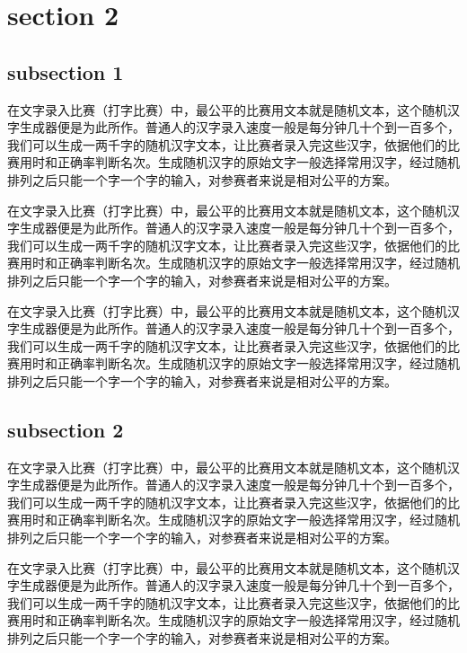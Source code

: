 \documentclass[12pt,hyperref,UTF8]{ctexbook}
\begin{document}
\section{section 2}

\subsection{subsection 1}

在文字录入比赛（打字比赛）中，最公平的比赛用文本就是随机文本，这个随机汉字生成器便是为此所作。普通人的汉字录入速度一般是每分钟几十个到一百多个，我们可以生成一两千字的随机汉字文本，让比赛者录入完这些汉字，依据他们的比赛用时和正确率判断名次。生成随机汉字的原始文字一般选择常用汉字，经过随机排列之后只能一个字一个字的输入，对参赛者来说是相对公平的方案。

在文字录入比赛（打字比赛）中，最公平的比赛用文本就是随机文本，这个随机汉字生成器便是为此所作。普通人的汉字录入速度一般是每分钟几十个到一百多个，我们可以生成一两千字的随机汉字文本，让比赛者录入完这些汉字，依据他们的比赛用时和正确率判断名次。生成随机汉字的原始文字一般选择常用汉字，经过随机排列之后只能一个字一个字的输入，对参赛者来说是相对公平的方案。

在文字录入比赛（打字比赛）中，最公平的比赛用文本就是随机文本，这个随机汉字生成器便是为此所作。普通人的汉字录入速度一般是每分钟几十个到一百多个，我们可以生成一两千字的随机汉字文本，让比赛者录入完这些汉字，依据他们的比赛用时和正确率判断名次。生成随机汉字的原始文字一般选择常用汉字，经过随机排列之后只能一个字一个字的输入，对参赛者来说是相对公平的方案。

\subsection{subsection 2}

在文字录入比赛（打字比赛）中，最公平的比赛用文本就是随机文本，这个随机汉字生成器便是为此所作。普通人的汉字录入速度一般是每分钟几十个到一百多个，我们可以生成一两千字的随机汉字文本，让比赛者录入完这些汉字，依据他们的比赛用时和正确率判断名次。生成随机汉字的原始文字一般选择常用汉字，经过随机排列之后只能一个字一个字的输入，对参赛者来说是相对公平的方案。

在文字录入比赛（打字比赛）中，最公平的比赛用文本就是随机文本，这个随机汉字生成器便是为此所作。普通人的汉字录入速度一般是每分钟几十个到一百多个，我们可以生成一两千字的随机汉字文本，让比赛者录入完这些汉字，依据他们的比赛用时和正确率判断名次。生成随机汉字的原始文字一般选择常用汉字，经过随机排列之后只能一个字一个字的输入，对参赛者来说是相对公平的方案。
\end{document}
